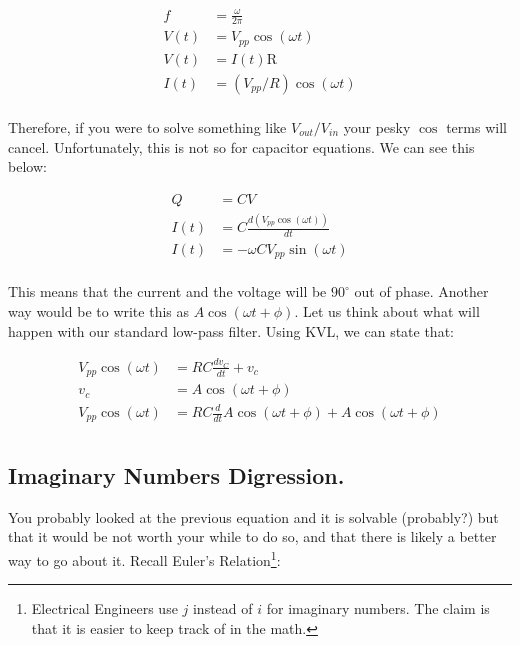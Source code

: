 \documentclass[12pt]{report}
\newcommand{\pr}[1]{\left(#1\right)}
\newcommand{\Vpp}{{ V}_{ pp}}
\newcommand{\Vo}{{V}_{out}}
\newcommand{\Vi}{{V}_{in}}
\begin{document}
\begin{equation} \label{freq1}
\begin{split}
f &= \frac{\omega}{2\pi}\\
V(t) &= \Vpp \cos\pr{\omega t} \\
V(t) &= I(t)\mathrm{R} \\
I(t) & = \pr{\Vpp / {R}} \cos\pr{\omega t}\\
\end{split}
\end{equation}\newline

Therefore, if you were to solve something like $\Vo / \Vi$ your pesky $\cos$ terms will cancel. Unfortunately, this is not so for capacitor equations. We can see this below: 

\begin{equation} \label{freq2}
\begin{split}
Q &= CV \\
I(t) &= C \frac{d \pr{\Vpp \cos\pr{\omega t}}}{dt} \\
I(t) &= - \omega C \Vpp \sin \pr{\omega t} \\
\end{split}
\end{equation}\newline

This means that the current and the voltage will be $90^{\circ}$ out of phase. Another way would be to write this as $A \cos \pr{\omega t + \phi}$. Let us think about what will happen with our standard low-pass filter. Using KVL, we can state that: 

\begin{equation} \label{freq3}
\begin{split}
\Vpp \cos\pr{\omega t} &= RC\frac{dv_C}{dt} + v_c \\ 
v_c &= A \cos \pr{\omega t + \phi} \\ 
\Vpp \cos\pr{\omega t} &= RC\frac{d}{dt}A \cos \pr{\omega t + \phi} + A \cos \pr{\omega t + \phi} \\
\end{split}
\end{equation}


\subsection{Imaginary Numbers Digression.}
You probably looked at the previous equation and it is solvable (probably?) but that it would be not worth your while to do so, and that there is likely a better way to go about it. Recall Euler's Relation\footnote{Electrical Engineers use $j$ instead of $i$ for imaginary numbers. The claim is that it is easier to keep track of in the math.}: 
\end{document}
